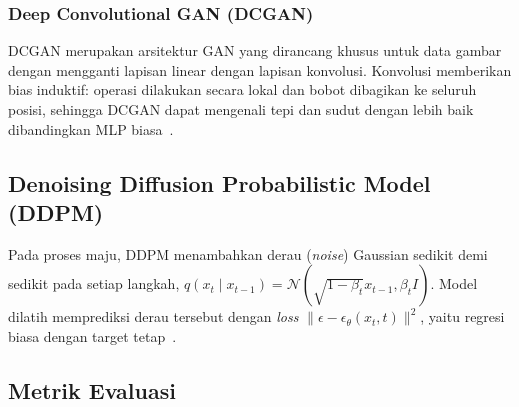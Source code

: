 \documentclass{article}
\begin{document}
\subsubsection{Deep Convolutional GAN (DCGAN)}
DCGAN merupakan arsitektur GAN yang dirancang khusus untuk data gambar dengan mengganti lapisan linear dengan lapisan konvolusi. Konvolusi memberikan bias induktif: operasi dilakukan secara lokal dan bobot dibagikan ke seluruh posisi, sehingga DCGAN dapat mengenali tepi dan sudut dengan lebih baik dibandingkan MLP biasa~\cite{radford2016}.

\subsection{Denoising Diffusion Probabilistic Model (DDPM)}
Pada proses maju, DDPM menambahkan derau (\textit{noise}) Gaussian sedikit demi sedikit pada setiap langkah, $q(x_t \mid x_{t-1})=\mathcal{N}(\sqrt{1-\beta_t}x_{t-1},\beta_t I)$. Model dilatih memprediksi derau tersebut dengan \textit{loss} $\lVert \epsilon - \epsilon_\theta(x_t,t)\rVert^2$, yaitu regresi biasa dengan target tetap~\cite{ho2020}.

\subsection{Metrik Evaluasi}
\begin{table}[H]
    \centering
    \caption{Metrik evaluasi}
    \label{tab:metricdef}
\end{table}
\end{document}
